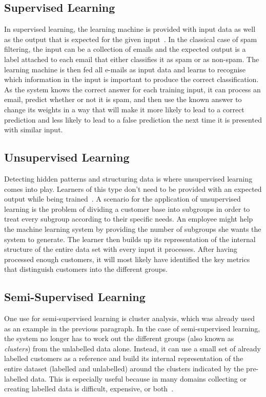 \documentclass[
			   fontsize=11pt,
               paper=a4,
               bibliography=totoc,
               idxtotoc,
               headsepline,
               footsepline,
               footinclude=false,
               BCOR=12mm,
               DIV=13,
               openany,   %
               ]
               {scrbook}
\begin{document}
\subsection{Supervised Learning}
In supervised learning, the learning machine is provided with input data as well as the output that is expected for the given input~\cite{introSupervised}. In the classical case of spam filtering, the input can be a collection of emails and the expected output is a label attached to each email that either classifies it as spam or as non-spam. The learning machine is then fed all e-mails as input data and learns to recognise which information in the input is important to produce the correct classification. As the system knows the correct answer for each training input, it can process an email, predict whether or not it is spam, and then use the known answer to change its weights in a way that will make it more likely to lead to a correct prediction and less likely to lead to a false prediction the next time it is presented with similar input.

\subsection{Unsupervised Learning}
Detecting hidden patterns and structuring data is where unsupervised learning comes into play. Learners of this type don't need to be provided with an expected output while being trained~\cite{introUnsupervised}. A scenario for the application of unsupervised learning is the problem of dividing a customer base into subgroups in order to treat every subgroup according to their specific needs. An employee might help the machine learning system by providing the number of subgroups she wants the system to generate. The learner then builds up its representation of the internal structure of the entire data set with every input it processes. After having processed enough customers, it will most likely have identified the key metrics that distinguish customers into the different groups. 

\subsection{Semi-Supervised Learning}
One use for semi-supervised learning is cluster analysis, which was already used as an example in the previous paragraph. In the case of semi-supervised learning, the system no longer has to work out the different groups (also known as \textit{clusters}) from the unlabelled data alone. Instead, it can use a small set of already labelled customers as a reference and build its internal representation of the entire dataset (labelled and unlabelled) around the clusters indicated by the pre-labelled data. This is especially useful because in many domains collecting or creating labelled data is difficult, expensive, or both~\cite{introSemiSup}.
\end{document}
